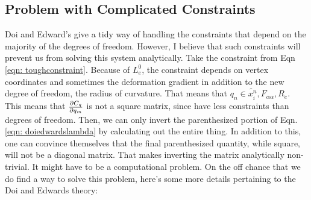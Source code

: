 \documentclass[12pt]{article}
\begin{document}
\subsection{Problem with Complicated Constraints}
Doi and Edward's give a tidy way of handling the constraints that depend on the majority of the degrees of freedom. However, I believe that such constraints will prevent us from solving this system analytically. Take the constraint from Eqn \ref{eqn: toughconstraint}. Because of $L_e^0$, the constraint depends on vertex coordinates and sometimes the deformation gradient in addition to the new degree of freedom, the radius of curvature. That means that $q_n \in {{\tilde{x_i^n}}, {F_{\alpha\alpha}}, {R_e}}$. This means that $\pdv{C_q}{q_m}$ is not a square matrix, since have less constraints than degrees of freedom. Then, we can only invert the parenthesized portion of Eqn. \ref{eqn: doiedwardslambda} by calculating out the entire thing. In addition to this, one can convince themselves that the final parenthesized quantity, while square, will not be a diagonal matrix. That makes inverting the matrix analytically non-trivial. It might have to be a computational problem. On the off chance that we do find a way to solve this problem, here's some more details pertaining to the Doi and Edwards theory: \\ \\ 
\end{document}
